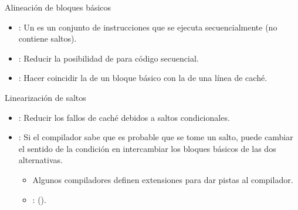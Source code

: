 \begin{frame}[t]{Alineación de bloques básicos}
\begin{itemize}
  \item {}: 
        Un  es un conjunto de instrucciones 
        que se ejecuta secuencialmente (no contiene saltos).

  \item {}: Reducir la posibilidad de 
         para código secuencial.

  \item {}: 
        Hacer coincidir la  de un bloque básico 
        con la  de una línea de caché.
\end{itemize}
\end{frame}

\begin{frame}[t]{Linearización de saltos}
\begin{itemize}
  \item {}: Reducir los fallos de caché debidos a saltos condicionales.

  \item {}: Si el compilador sabe que es probable que se tome un salto, 
        puede cambiar el sentido de la condición en intercambiar los bloques 
        básicos de las dos alternativas.
    \begin{itemize}
      \item Algunos compiladores definen extensiones para dar pistas al compilador.
      \item {}:  ().
    \end{itemize}

\end{itemize}
\end{frame}

